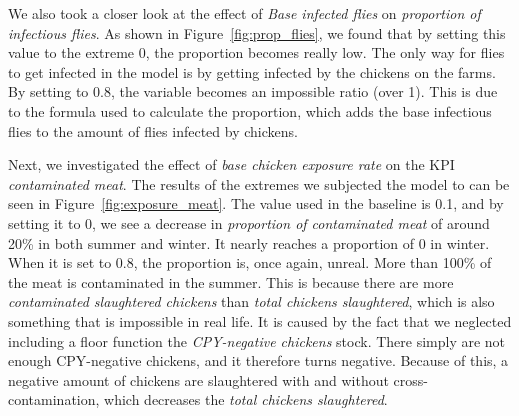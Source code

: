 We also took a closer look at the effect of \textit{Base infected flies} on \textit{proportion of infectious flies}. As shown in Figure~\ref{fig:prop_flies}, we found that by setting this value to the extreme 0, the proportion becomes really low.  The only way for flies to get infected in the model is by getting infected by the chickens on the farms. By setting  to 0.8, the  variable becomes an impossible ratio (over 1). This is due to the formula used to calculate the proportion, which adds the base infectious flies to the amount of flies infected by chickens. 

Next, we investigated the effect of \textit{base chicken exposure rate} on the KPI \textit{contaminated meat}. The results of the extremes we subjected the model to can be seen in Figure~\ref{fig:exposure_meat}. The value used in the baseline is 0.1, and by setting it to 0, we see a decrease in \textit{proportion of contaminated meat} of around 20\% in both summer and winter. It nearly reaches a proportion of 0 in winter. When it is set to 0.8, the proportion is, once again, unreal. More than 100\% of the meat is contaminated in the summer. This is because there are more \textit{contaminated slaughtered chickens} than \textit{total chickens slaughtered}, which is also something that is impossible in real life. It is caused by the fact that we neglected including a floor function the \textit{CPY-negative chickens} stock. There simply are not enough CPY-negative chickens, and it therefore turns negative. Because of this, a negative amount of chickens are slaughtered with and without cross-contamination, which decreases the \textit{total chickens slaughtered}.

